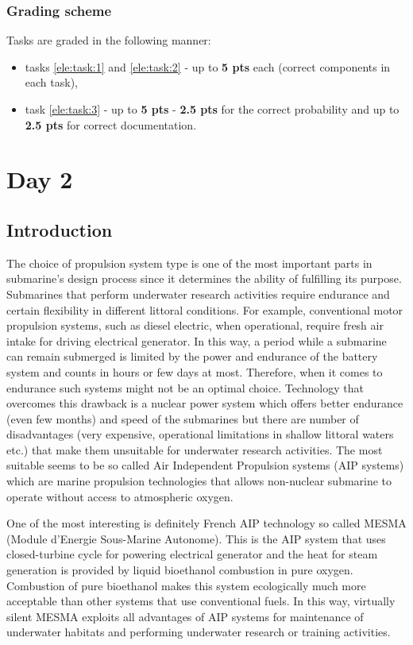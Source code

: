 \documentclass[openany]{book}
\begin{document}
	\subsection{Grading scheme}
	Tasks are graded in the following manner:
	\begin{itemize}
		\item tasks \ref{ele:task:1} and \ref{ele:task:2} - up to \textbf{5 
		pts} 
		each (correct components in each task), 
		\item task \ref{ele:task:3} - up to \textbf{5 pts} - \textbf{2.5 pts} 
		for 
		the correct probability and up to \textbf{2.5 pts} for correct 
		documentation.
	\end{itemize}
	
	
	
	\chapter{Day 2}
	
	\section{Introduction}
	
	The choice of propulsion system type is one of the most important parts in 
	submarine’s design process since it determines the ability of fulfilling 
	its purpose. Submarines that perform underwater research activities require 
	endurance and certain flexibility in different littoral conditions. For 
	example, conventional motor propulsion systems, such as diesel electric, 
	when operational, require fresh air intake for driving electrical 
	generator. In this way, a period while a submarine can remain submerged is 
	limited by the power and endurance of the battery system and counts in 
	hours or few days at most. Therefore, when it comes to endurance such 
	systems might not be an optimal choice. Technology that overcomes this 
	drawback is a nuclear power system which offers better endurance (even few 
	months) and speed of the submarines but there are number of disadvantages 
	(very expensive, operational limitations in shallow littoral waters etc.) 
	that make them unsuitable for underwater research activities. The most 
	suitable seems to be so called Air Independent Propulsion systems (AIP 
	systems) which are marine propulsion technologies that allows non-nuclear 
	submarine to operate without access to atmospheric oxygen. 
	
	One of the most interesting is definitely French AIP technology so called 
	MESMA (Module d'Energie Sous-Marine Autonome). This is the AIP system that 
	uses closed-turbine cycle for powering electrical generator and the heat 
	for steam generation is provided by liquid bioethanol combustion in pure 
	oxygen. Combustion of pure bioethanol makes this system ecologically much 
	more acceptable than other systems that use conventional fuels. In this 
	way, virtually silent MESMA exploits all advantages of AIP systems for 
	maintenance of underwater habitats and performing underwater research or 
	training activities.
	
\end{document}
